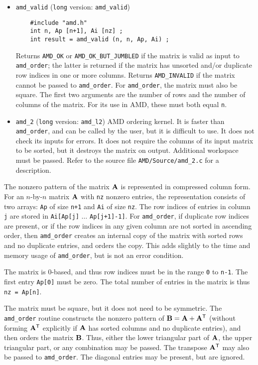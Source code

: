 \documentclass[11pt]{article}
\newcommand{\m}[1]{{\bf{#1}}}       %
\newcommand{\tr}{^{\sf T}}          %
\begin{document}
\begin{itemize}
\item {\tt amd\_valid}
({\tt long} version: {\tt amd\_valid})
    {\footnotesize
    \begin{verbatim}
    #include "amd.h"
    int n, Ap [n+1], Ai [nz] ;
    int result = amd_valid (n, n, Ap, Ai) ;
    \end{verbatim}
    }
    Returns {\tt AMD\_OK} or {\tt AMD\_OK\_BUT\_JUMBLED}
    if the matrix is valid as input to {\tt amd\_order};
    the latter is returned if the matrix has unsorted and/or duplicate
    row indices in one or more columns. 
    Returns {\tt AMD\_INVALID} if the matrix cannot be passed to
    {\tt amd\_order}.
    For {\tt amd\_order}, the matrix must
    also be square.  The first two arguments are the number of rows and the
    number of columns of the matrix.  For its use in AMD, these must both
    equal {\tt n}.

\item {\tt amd\_2}
({\tt long} version: {\tt amd\_l2})
    AMD ordering kernel.  It is faster than {\tt amd\_order}, and
    can be called by the user, but it is difficult to use.
    It does not check its inputs for errors.
    It does not require the columns of its input matrix to be sorted,
    but it destroys the matrix on output.  Additional workspace must be passed.
    Refer to the source file {\tt AMD/Source/amd\_2.c} for a description.

\end{itemize}

The nonzero pattern of the matrix $\m{A}$ is represented in compressed column
form.
For an $n$-by-$n$ matrix $\m{A}$ with {\tt nz} nonzero entries, the
representation consists of two arrays: {\tt Ap} of size {\tt n+1} and {\tt Ai}
of size {\tt nz}.  The row indices of entries in column {\tt j} are stored in
    {\tt Ai[Ap[j]} $\ldots$ {\tt Ap[j+1]-1]}.
For {\tt amd\_order},
if duplicate row indices are present, or if the row indices in any given
column are not sorted in ascending order, then {\tt amd\_order} creates
an internal copy of the matrix with sorted rows and no duplicate entries,
and orders the copy.  This adds slightly to the time and memory usage of
{\tt amd\_order}, but is not an error condition.

The matrix is 0-based, and thus
row indices must be in the range {\tt 0} to {\tt n-1}.
The first entry {\tt Ap[0]} must be zero.
The total number of entries in the matrix is thus {\tt nz = Ap[n]}.

The matrix must be square, but it does not need to be symmetric.
The {\tt amd\_order} routine constructs the nonzero pattern of
$\m{B} = \m{A}+\m{A}\tr$ (without forming $\m{A}\tr$ explicitly if
$\m{A}$ has sorted columns and no duplicate entries),
and then orders the matrix $\m{B}$.  Thus, either the
lower triangular part of $\m{A}$, the upper triangular part,
or any combination may be passed.  The transpose $\m{A}\tr$ may also be
passed to {\tt amd\_order}.
The diagonal entries may be present, but are ignored.
\end{document}
